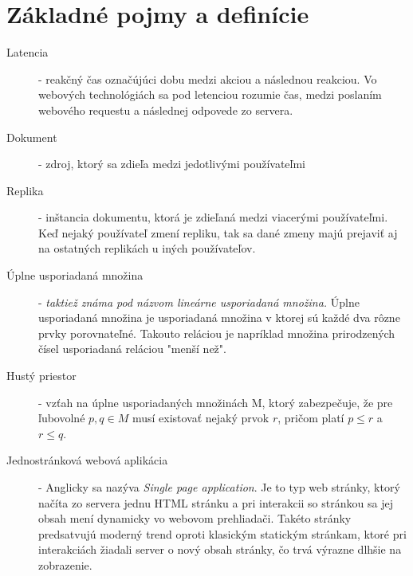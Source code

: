 \chapter{Základné pojmy a definície}

\label{kap:zakladne} %

\begin{description}
\item [Latencia] - reakčný čas označújúci dobu medzi akciou a následnou reakciou. Vo webových 
technológiách sa pod letenciou rozumie čas, medzi poslaním webového requestu a následnej
odpovede zo servera.
\item [Dokument] - zdroj, ktorý sa zdieľa medzi jedotlivými používateľmi
\item [Replika] - inštancia dokumentu, ktorá je zdieľaná medzi viacerými používateľmi. Keď nejaký
používateľ zmení repliku, tak sa dané zmeny majú prejaviť aj na ostatných replikách u iných
používateľov.
\item [Úplne usporiadaná množina] - \textit{taktiež známa pod názvom lineárne usporiadaná množina.} 
Úplne usporiadaná množina je usporiadaná množina v ktorej sú každé dva rôzne prvky porovnateľné. 
Takouto reláciou je napríklad množina prirodzených čísel usporiadaná reláciou "menší než".
\item [Hustý priestor] - vzťah na úplne usporiadaných množinách M, ktorý zabezpečuje, že pre 
ľubovolné $p, q \in M$ musí existovať nejaký prvok $r$, pričom platí $p \leq r$ a 
$r \leq q$.
\item [Jednostránková webová aplikácia] - Anglicky sa nazýva \textit{Single page application}. Je to
typ web stránky, ktorý načíta zo servera jednu HTML stránku a pri interakcii so stránkou sa jej 
obsah mení dynamicky vo webovom prehliadači. Takéto stránky predsatvujú moderný trend oproti
klasickým statickým stránkam, ktoré pri interakciách žiadali server o nový obsah stránky, čo
trvá výrazne dlhšie na zobrazenie.
\end{description}
